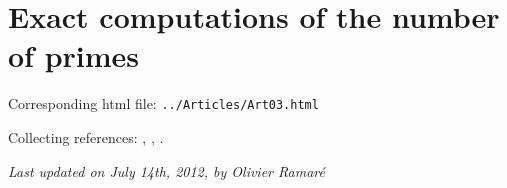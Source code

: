 \chapter{   Exact computations of the number of primes}

Corresponding html file: \texttt{../Articles/Art03.html}









Collecting references:
\cite{Deleglise-Rivat*96-1},
\cite{Deleglise-Rivat*98},
\cite{Platt*11}.




 
 







  
\begin{flushright}\small\sl{}   Last updated on July 14th, 2012, by Olivier Ramar\'e
 \end{flushright}















